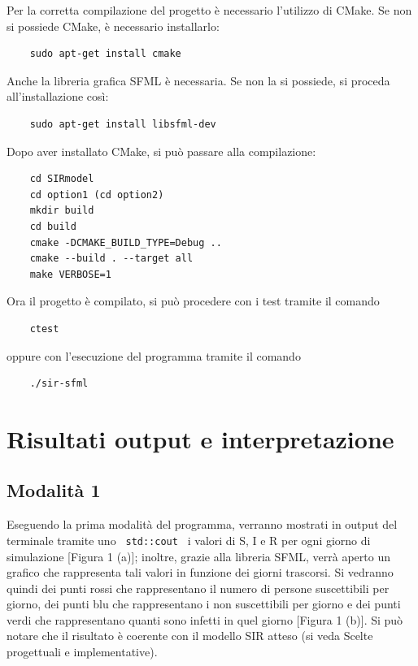 \documentclass[a4paper,10 pt]{article}
\begin{document}
Per la corretta compilazione del progetto è necessario l'utilizzo di CMake. %
Se non si possiede CMake, è necessario installarlo:
\begin{lstlisting}
	sudo apt-get install cmake
\end{lstlisting}
Anche la libreria grafica SFML è necessaria. Se non la si possiede, si proceda all'installazione così:
\begin{lstlisting}
	sudo apt-get install libsfml-dev
\end{lstlisting}
Dopo aver installato CMake, si può passare alla compilazione:
\begin{lstlisting}
	cd SIRmodel
	cd option1 (cd option2)
	mkdir build
	cd build
	cmake -DCMAKE_BUILD_TYPE=Debug ..
	cmake --build . --target all
	make VERBOSE=1 
\end{lstlisting}
Ora il progetto è compilato, si può procedere con i test tramite il comando
\begin{lstlisting}
	ctest
\end{lstlisting}
oppure con l'esecuzione del programma tramite il comando
\begin{lstlisting}
	./sir-sfml
\end{lstlisting}
\section{Risultati output e interpretazione}
\subsection{Modalità 1}
Eseguendo la prima modalità del programma, verranno mostrati in output del terminale tramite uno  \verb! std::cout ! i valori di S, I e R per ogni giorno di simulazione [Figura 1 (a)]; inoltre, grazie alla libreria SFML, verrà aperto un grafico che rappresenta tali valori in funzione dei giorni trascorsi. Si vedranno quindi dei punti rossi che rappresentano il numero di persone suscettibili per giorno, dei punti blu che rappresentano i non suscettibili per giorno e dei punti verdi che rappresentano quanti sono infetti in quel giorno [Figura 1 (b)]. Si può notare che il risultato è coerente con il modello SIR atteso (si veda Scelte progettuali e implementative).
\end{document}
